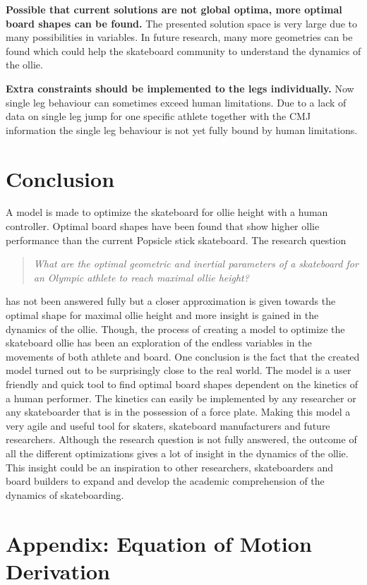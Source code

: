 \documentclass[default,iicol]{sn-jnl}
\begin{document}
\noindent\textbf{Possible that current solutions are not global optima, more optimal board shapes can be found.} The presented solution space is very large due to many possibilities in variables. In future research, many more geometries can be found which could help the skateboard community to understand the dynamics of the ollie. 

\noindent\textbf{Extra constraints should be implemented to the legs individually.} Now single leg behaviour can sometimes exceed human limitations. Due to a lack of data on single leg jump for one specific athlete together with the CMJ information the single leg behaviour is not yet fully bound by human limitations.

\section{Conclusion}
\noindent A model is made to optimize the skateboard for ollie height with a human controller. Optimal board shapes have been found that show higher ollie performance than the current Popsicle stick skateboard. The research question 
\begin{quote}
\textit{What are the optimal geometric and inertial parameters of a skateboard for an Olympic athlete to reach maximal ollie height? 
}\end{quote}
has not been answered fully but a closer approximation is given towards the optimal shape for maximal ollie height and more insight is gained in the dynamics of the ollie. Though, the process of creating a model to optimize the skateboard ollie has been an exploration of the endless variables in the movements of both athlete and board. One conclusion is the fact that the created model turned out to be surprisingly close to the real world. The model is a user friendly and quick tool to find optimal board shapes dependent on the kinetics of a human performer. The kinetics can easily be implemented by any researcher or any skateboarder that is in the possession of a force plate. Making this model a very agile and useful tool for skaters, skateboard manufacturers and future researchers. Although the research question is not fully answered, the outcome of all the different optimizations gives a lot of insight in the dynamics of the ollie. This insight could be an inspiration to other researchers, skateboarders and board builders to expand and develop the academic comprehension of the dynamics of skateboarding. 




\section{Appendix: Equation of Motion Derivation}

\pagestyle{plain}
%
%
\end{document}
